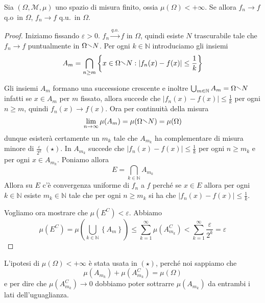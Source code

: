 \begin{theorem}\label{thm:severini-egorov}
    Sia \({(\Omega, \mathcal{M}, \mu)}\) uno spazio di misura finito, ossia
    \(\mu{(\Omega)} < +\infty\). Se allora \(f_{n} \to f\) q.o~in \(\Omega\),
    \(f_{n} \to f\) q.u.~in \(\Omega\).
\end{theorem}
\begin{proof}
    Iniziamo fissando \(\varepsilon>0\).
    \(f_{n} \overset{q.o.}{\to } f\) in \(\Omega\), quindi esiste \(N\)
    trascurabile tale che \(f_{n} \to f\) puntualmente in \(\Omega \sminus N\).
    Per ogni \(k \in \mathbb{N}\) introduciamo gli insiemi \[A_{m} = \bigcap_{n
    \ge m} \left\{x \in \Omega \sminus N : \left| f_{n}{(x)} - f{(x)} \right| \le
\frac{1}{k}\right\} \]

    Gli insiemi \(A_{m}\) formano una successione crescente e inoltre 
    \(
        \bigcup_{m \in \mathbb{N}} A_{m} = \Omega \sminus N
    \)
    infatti se \(x \in A_{m}\) per \(m\) fissato, allora succede che
    \(|f_{n}{(x)} - f{(x)}| \le \frac{1}{k}\) per ogni \(n\ge m\), quindi
    \(f_{n}{(x)} \to f{(x)}\). Ora per continuità della misura 
    \[
        \lim_{n \to \infty} \mu{(A_{m})} = \mu{(\Omega \sminus N)} = \mu{(\Omega)}
    \]
    dunque esisterà certamente un \(m_k\) tale che \(A_{m_k}\) ha complementare
    di misura minore di \(\frac{\varepsilon}{2^{k}}\) \((\star)\). In \(A_{m_k}\) succede
    che \(|f_{n}{(x)} - f{(x)}| \le \frac{1}{k}\) per ogni \(n \ge m_k\) e per
    ogni \(x \in A_{m_k} \). Poniamo allora
    \[
        E = \bigcap_{k \in \mathbb{N}} A_{m_k}
    \]
    Allora su \(E\) c'è convergenza uniforme di \(f_{n}\) a \(f\) perché
    se \(x \in E\) allora per ogni \(k \in \mathbb{N}\) esiste \(m_k \in
    \mathbb{N}\) tale che per ogni \(n \ge m_k\) si ha che \(|f_{n}{(x)} -
    f{(x)}| \le \frac{1}{k}\). 

    Vogliamo ora mostrare che \(\mu {\left( E^{C} \right)} < \varepsilon\).
    Abbiamo
    \[
        \mu{\left( E^{C} \right)} = \mu {\left( \bigcup_{k \in \mathbb{N}}
    \left\{ A_{m} \right\} \right)} \le \sum_{k=1}^{\infty} \mu{(A_{m_k}^{C})} <
    \sum_{k=1}^{\infty} \frac{\varepsilon}{2^{k}} = \varepsilon 
    \]
\end{proof}
\begin{note}
    L'ipotesi di \(\mu{(\Omega)} < +\infty\) è stata usata in \((\star)\),
    perché noi sappiamo che
    \[
        \mu{\left( A_{m_k}  \right)} +\mu{\left( A_{m_k} ^{C} \right)} = \mu{(\Omega)}
    \]
    e per dire che \(\mu{\left( A_{m_k} ^{C} \right)} \to 0\) dobbiamo poter
    sottrarre \(\mu{\left( A_{m_k}  \right)} \) da entrambi i lati
    dell'uguaglianza.
\end{note}

